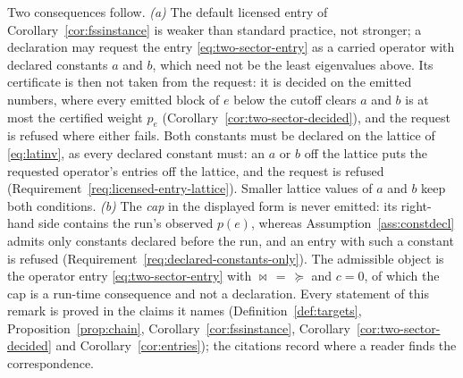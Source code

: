 \begin{remark}
Two consequences follow. \emph{(a)} The default licensed entry of
Corollary~\ref{cor:fssinstance} is weaker than standard practice, not
stronger; a declaration may request the entry \eqref{eq:two-sector-entry}
as a carried operator with declared constants $a$ and $b$, which need not be
the least eigenvalues above. Its certificate is then not taken from the
request: it is decided on the emitted numbers, where every emitted block of
$e$ below the cutoff clears $a$ and $b$ is at most the certified weight
$p_e$ (Corollary~\ref{cor:two-sector-decided}), and the request is refused
where either fails. Both constants must be declared on the lattice of
\eqref{eq:latinv}, as every declared constant must: an $a$ or $b$ off the
lattice puts the requested operator's entries off the lattice, and the
request is refused (Requirement~\ref{req:licensed-entry-lattice}). Smaller
lattice values of $a$ and $b$ keep both conditions. \emph{(b)} The \emph{cap} in
the displayed form is never emitted: its right-hand side contains the run's
observed $p(e)$, whereas Assumption~\ref{ass:constdecl} admits only constants
declared before the run, and an entry with such a constant is refused
(Requirement~\ref{req:declared-constants-only}). The admissible object is the
operator entry \eqref{eq:two-sector-entry} with $\bowtie\,=\,\succeq$ and $c=0$, of
which the cap is a run-time consequence and not a declaration. Every statement
of this remark is proved in the claims it names
(Definition~\ref{def:targets}, Proposition~\ref{prop:chain},
Corollary~\ref{cor:fssinstance}, Corollary~\ref{cor:two-sector-decided} and
Corollary~\ref{cor:entries}); the
citations record where a reader finds the correspondence.
\end{remark}
